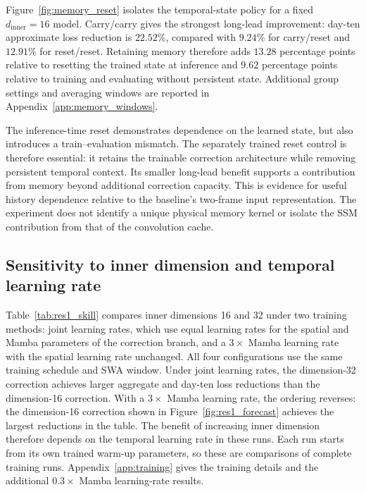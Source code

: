 \documentclass{article}
\begin{document}
Figure~\ref{fig:memory_reset} isolates the temporal-state policy for a fixed $d_{\mathrm{inner}}=16$ model. Carry/carry gives the strongest long-lead improvement: day-ten approximate loss reduction is $22.52\%$, compared with $9.24\%$ for carry/reset and $12.91\%$ for reset/reset. Retaining memory therefore adds $13.28$ percentage points relative to resetting the trained state at inference and $9.62$ percentage points relative to training and evaluating without persistent state. Additional group settings and averaging windows are reported in Appendix~\ref{app:memory_windows}.

The inference-time reset demonstrates dependence on the learned state, but also introduces a train--evaluation mismatch. The separately trained reset control is therefore essential: it retains the trainable correction architecture while removing persistent temporal context. Its smaller long-lead benefit supports a contribution from memory beyond additional correction capacity. This is evidence for useful history dependence relative to the baseline's two-frame input representation. The experiment does not identify a unique physical memory kernel or isolate the SSM contribution from that of the convolution cache.

\clearpage
\subsection{Sensitivity to inner dimension and temporal learning rate}
\label{sec:training_sensitivity}
Table~\ref{tab:res1_skill} compares inner dimensions 16 and 32 under two training methods: joint learning rates, which use equal learning rates for the spatial and Mamba parameters of the correction branch, and a $3\times$ Mamba learning rate with the spatial learning rate unchanged. All four configurations use the same training schedule and SWA window. Under joint learning rates, the dimension-32 correction achieves larger aggregate and day-ten loss reductions than the dimension-16 correction. With a $3\times$ Mamba learning rate, the ordering reverses: the dimension-16 correction shown in Figure~\ref{fig:res1_forecast} achieves the largest reductions in the table. The benefit of increasing inner dimension therefore depends on the temporal learning rate in these runs. Each run starts from its own trained warm-up parameters, so these are comparisons of complete training runs. Appendix~\ref{app:training} gives the training details and the additional $0.3\times$ Mamba learning-rate results.
\end{document}
